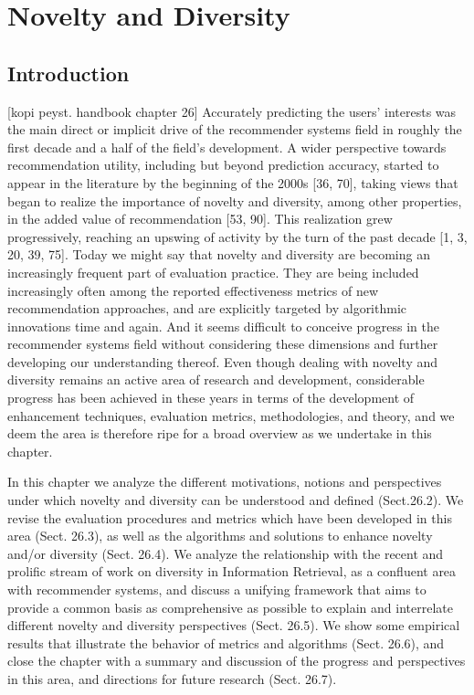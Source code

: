 
\section{Novelty and Diversity}\label{section:novelty_and_diversity}

\subsection{Introduction}
[kopi peyst. handbook chapter 26]
Accurately predicting the users’ interests was the main direct or implicit drive of the recommender systems field in roughly the first decade and a half of the field’s development. A wider perspective towards recommendation utility, including but beyond prediction accuracy, started to appear in the literature by the beginning of the 2000s [36, 70], taking views that began to realize the importance of novelty and diversity, among other properties, in the added value of recommendation [53, 90]. This realization grew progressively, reaching an upswing of activity by the turn of the past decade [1, 3, 20, 39, 75]. Today we might say that novelty and diversity are becoming an increasingly frequent part of evaluation practice. They are being included increasingly often among the reported effectiveness metrics of new recommendation approaches, and are explicitly targeted by algorithmic innovations time and again. And it seems difficult to conceive progress in the recommender systems field without considering these dimensions and further developing our understanding thereof. Even though dealing with novelty and diversity remains an active area of research and development, considerable progress has been achieved in these years in terms of the development of enhancement techniques, evaluation metrics, methodologies, and theory, and we deem the area is therefore ripe for a broad overview as we undertake in this chapter.

In this chapter we analyze the different motivations, notions and perspectives under which novelty and diversity can be understood and defined (Sect.26.2). We revise the evaluation procedures and metrics which have been developed in this area (Sect. 26.3), as well as the algorithms and solutions to enhance novelty and/or diversity (Sect. 26.4). We analyze the relationship with the recent and prolific stream of work on diversity in Information Retrieval, as a confluent area with recommender systems, and discuss a unifying framework that aims to provide a common basis as comprehensive as possible to explain and interrelate different novelty and diversity perspectives (Sect. 26.5). We show some empirical results that illustrate the behavior of metrics and algorithms (Sect. 26.6), and close the chapter with a summary and discussion of the progress and perspectives in this area, and directions for future research (Sect. 26.7).

